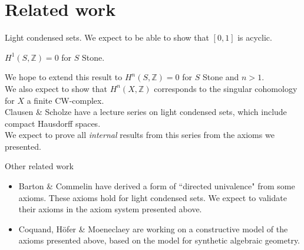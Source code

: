 \documentclass{beamer}
\begin{document}
\section{Related work}
\begin{frame}{Light condensed sets.}
  We expect to be able to show that $[0,1]$ is acyclic. 
  \pause 
    \begin{lemma}
      $H^1(S,\mathbb Z) = 0$ for $S$ Stone.
    \end{lemma}
    \pause 
    We hope to extend this result to 
      $H^n(S,\mathbb Z) = 0$ for $S$ Stone and $n>1$.
      \pause
      \\
      We also expect to show that $H^n(X,\mathbb Z)$ corresponds to the singular cohomology 
      for $X$ a finite CW-complex.\\
  \pause 
    Clausen \& Scholze have a lecture series on light condensed sets, which include compact Hausdorff spaces. \\
    \pause
    We expect to prove all \textit{internal} results from this series from the axioms we presented. 
\end{frame}
\begin{frame}{Other related work}
  \begin{itemize}
    \item 
      Barton \& Commelin have derived a form of ``directed univalence" from some axioms. \pause
      These axioms hold for light condensed sets. \pause
      We expect to validate their axioms in the axiom system presented above. 
      \pause
    \item 
    Coquand, H\"ofer \& Moeneclaey are working on a 
    constructive model of the axioms presented above, 
    based on the model for synthetic algebraic geometry. 
\end{itemize}
\end{frame}

\end{document}
